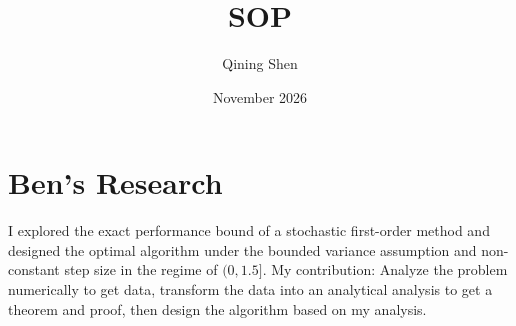 \documentclass{article}
\title{SOP}
\author{Qining Shen}
\date{November 2026}
\begin{document}
\maketitle

\section{Ben's Research}
I explored the exact performance bound of a stochastic first-order method and designed the optimal algorithm under the bounded variance assumption and non-constant step size in the regime of $(0,1.5]$. My contribution: Analyze the problem numerically to get data, transform the data into an analytical analysis to get a theorem and proof, then design the algorithm based on my analysis.
\end{document}
